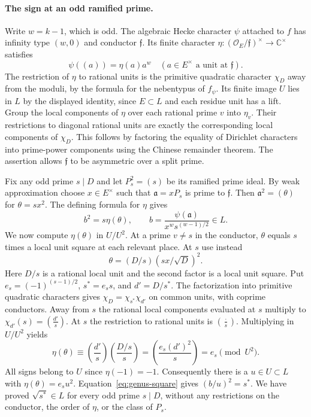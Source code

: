 \paragraph{The sign at an odd ramified prime.}
Write $w=k-1$, which is odd. The algebraic Hecke character $\psi$ attached to $f$ has infinity type $(w,0)$ and conductor $\mathfrak f$. Its finite character $\eta:(\mathcal O_E/\mathfrak f)^\times\to\mathbb C^\times$ satisfies
\[
       \psi((a))=\eta(a)a^w\quad (a\in E^\times\text{ a unit at }\mathfrak f).
\]
The restriction of $\eta$ to rational units is the primitive quadratic character $\chi_D$ away from the moduli, by the formula for the nebentypus of $f_\psi$. Its finite image $U$ lies in $L$ by the displayed identity, since $E\subset L$ and each residue unit has a lift. Group the local components of $\eta$ over each rational prime $v$ into $\eta_v$. Their restrictions to diagonal rational units are exactly the corresponding local components of $\chi_D$. This follows by factoring the equality of Dirichlet characters into prime-power components using the Chinese remainder theorem. The assertion allows $\mathfrak f$ to be asymmetric over a split prime.

Fix any odd prime $s\mid D$ and let $P_s^2=(s)$ be its ramified prime ideal. By weak approximation choose $x\in E^\times$ such that $\mathfrak a=xP_s$ is prime to $\mathfrak f$. Then $\mathfrak a^2=(\theta)$ for $\theta=sx^2$. The defining formula for $\eta$ gives
\begin{equation}
      b^2=s\eta(\theta),\qquad
      b=\frac{\psi(\mathfrak a)}{x^w s^{(w-1)/2}}\in L.   \label{eq:genus-square}
\end{equation}
We now compute $\eta(\theta)$ in $U/U^2$. At a prime $v\ne s$ in the conductor, $\theta$ equals $s$ times a local unit square at each relevant place. At $s$ use instead
\[
                 \theta=(D/s)(s x/\sqrt D)^2.
\]
Here $D/s$ is a rational local unit and the second factor is a local unit square. Put $e_s=(-1)^{(s-1)/2}$, $s^*=e_s s$, and $d'=D/s^*$. The factorization into primitive quadratic characters gives $\chi_D=\chi_{s^*}\chi_{d'}$ on common units, with coprime conductors. Away from $s$ the rational local components evaluated at $s$ multiply to $\chi_{d'}(s)=(\frac{d'}s)$. At $s$ the restriction to rational units is $(\frac{\cdot}s)$. Multiplying in $U/U^2$ yields
\[
     \eta(\theta)\equiv
        \left(\frac{d'}s\right)\left(\frac{D/s}{s}\right)
        =\left(\frac{e_s(d')^2}{s}\right)=e_s
        \pmod {U^2}.
\]
All signs belong to $U$ since $\eta(-1)=-1$. Consequently there is a $u\in U\subset L$ with $\eta(\theta)=e_s u^2$. Equation~\eqref{eq:genus-square} gives $(b/u)^2=s^*$. We have proved $\sqrt{s^*}\in L$ for every odd prime $s\mid D$, without any restrictions on the conductor, the order of $\eta$, or the class of $P_s$.


